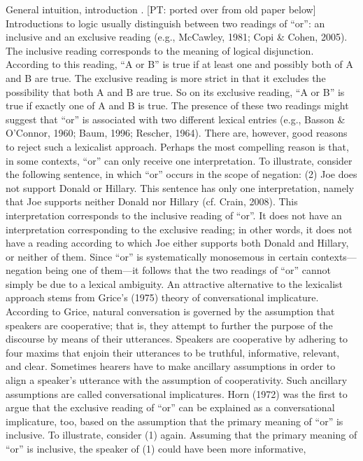 \documentclass{sp}
\newcommand{\pt}[1]{\textcolor{Cerulean}{[PT: #1]}}
\begin{document}
General intuition, introduction \citep[e.g.,][]{horn1972semantic}.
 \pt{ported over from old paper below}
Introductions to logic usually distinguish between two readings of “or”: an inclusive
and an exclusive reading (e.g., McCawley, 1981; Copi \& Cohen, 2005). The inclusive
reading corresponds to the meaning of logical disjunction. According to this reading,
“A or B” is true if at least one and possibly both of A and B are true. The exclusive
reading is more strict in that it excludes the possibility that both A and B are true. So
on its exclusive reading, “A or B” is true if exactly one of A and B is true. The presence of these two readings might suggest that “or” is associated with two
different lexical entries (e.g., Basson \& O’Connor, 1960; Baum, 1996; Rescher, 1964).
There are, however, good reasons to reject such a lexicalist approach. Perhaps the most
compelling reason is that, in some contexts, “or” can only receive one interpretation.
To illustrate, consider the following sentence, in which “or” occurs in the scope of
negation: (2) Joe does not support Donald or Hillary.
This sentence has only one interpretation, namely that Joe supports neither Donald nor
Hillary (cf. Crain, 2008). This interpretation corresponds to the inclusive reading of
“or”. It does not have an interpretation corresponding to the exclusive reading; in other
words, it does not have a reading according to which Joe either supports both Donald
and Hillary, or neither of them. Since “or” is systematically monosemous in certain
contexts—negation being one of them—it follows that the two readings of “or” cannot
simply be due to a lexical ambiguity.
An attractive alternative to the lexicalist approach stems from Grice’s (1975) theory
of conversational implicature. According to Grice, natural conversation is governed by
the assumption that speakers are cooperative; that is, they attempt to further the purpose
of the discourse by means of their utterances. Speakers are cooperative by adhering
to four maxims that enjoin their utterances to be truthful, informative, relevant,
and clear. Sometimes hearers have to make ancillary assumptions in order to align a
speaker’s utterance with the assumption of cooperativity. Such ancillary assumptions
are called conversational implicatures. Horn (1972) was the first to argue that the exclusive reading of “or” can be explained
as a conversational implicature, too, based on the assumption that the primary
meaning of “or” is inclusive. To illustrate, consider (1) again. Assuming that the primary
meaning of “or” is inclusive, the speaker of (1) could have been more informative,
\end{document}
